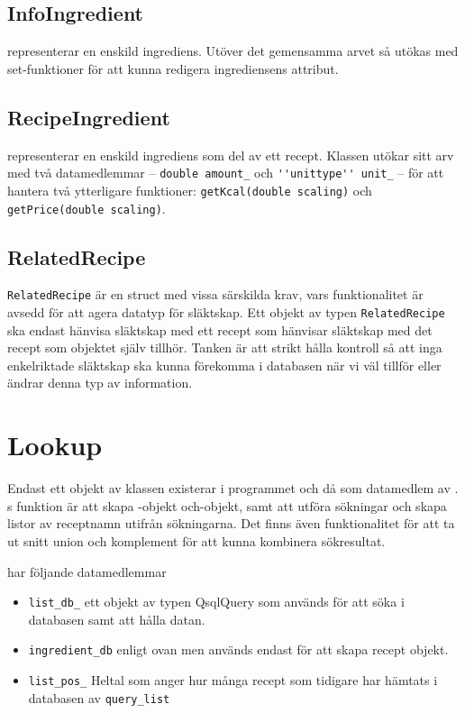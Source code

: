 \subsection{InfoIngredient}
\InfoIngredient{} representerar en enskild ingrediens. Utöver det gemensamma arvet så utökas \InfoIngredient{} med set-funktioner för att kunna redigera ingrediensens attribut.

\subsection{RecipeIngredient}
\RecipeIngredient{} representerar en enskild ingrediens som del av ett recept. Klassen utökar sitt arv med två datamedlemmar -- \verb=double amount_= och \verb=''unittype'' unit_= -- för att hantera två ytterligare funktioner: \verb+getKcal(double scaling)+ och \verb+getPrice(double scaling)+.
 
\subsection{RelatedRecipe}
\verb+RelatedRecipe+ är en struct med vissa särskilda krav, vars funktionalitet är avsedd för att agera datatyp för släktskap. Ett objekt av typen \verb+RelatedRecipe+ ska endast hänvisa släktskap med ett recept som hänvisar släktskap med det recept som objektet själv tillhör. Tanken är att strikt hålla kontroll så att inga enkelriktade släktskap ska kunna förekomma i databasen när vi väl tillför eller ändrar denna typ av information.



\section{Lookup}
Endast ett objekt av klassen \Lookup{} existerar i programmet och då som datamedlem av \Shell. \Lookup{}s funktion är att skapa \Recipe-objekt och\InfoIngredient-objekt, samt att utföra sökningar och skapa listor av receptnamn utifrån sökningarna. Det finns även funktionalitet för att ta ut snitt union och komplement för att kunna kombinera sökresultat.

\Lookup har följande datamedlemmar
  \begin{itemize}
    \item   \verb+list_db_+ ett objekt av typen QsqlQuery som används för att söka i databasen samt att hålla datan.
    \item   \verb+ingredient_db+ enligt ovan men används endast för att skapa recept objekt.
    \item   \verb+list_pos_+ Heltal som anger hur många recept som tidigare har hämtats i databasen av \verb+query_list+
  \end{itemize}

